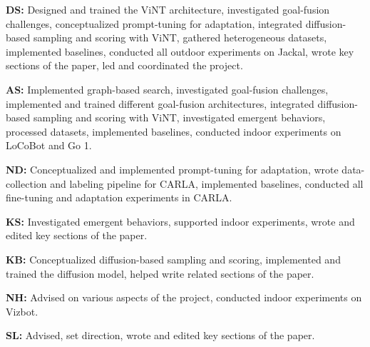 \documentclass{article}
\newcommand{\ModelName}{ViNT\xspace}
\newcommand{\MyPara}[1]{\noindent\textbf{#1}}
\begin{document}
\MyPara{DS:} Designed and trained the \ModelName architecture, investigated goal-fusion challenges, conceptualized prompt-tuning for adaptation, integrated diffusion-based sampling and scoring with \ModelName, gathered heterogeneous datasets, implemented baselines, conducted all outdoor experiments on Jackal, wrote key sections of the paper, led and coordinated the project.

\MyPara{AS:} Implemented graph-based search, investigated goal-fusion challenges, implemented and trained different goal-fusion architectures, integrated diffusion-based sampling and scoring with \ModelName, investigated emergent behaviors, processed datasets, implemented baselines, conducted indoor experiments on LoCoBot and Go 1.

\MyPara{ND:} Conceptualized and implemented prompt-tuning for adaptation, wrote data-collection and labeling pipeline for CARLA, implemented baselines, conducted all fine-tuning and adaptation experiments in CARLA.

\MyPara{KS:} Investigated emergent behaviors, supported indoor experiments, wrote and edited key sections of the paper.

\MyPara{KB:} Conceptualized diffusion-based sampling and scoring, implemented and trained the diffusion model, helped write related sections of the paper.

\MyPara{NH:} Advised on various aspects of the project, conducted indoor experiments on Vizbot.

\MyPara{SL:} Advised, set direction, wrote and edited key sections of the paper.


\clearpage

\end{document}
